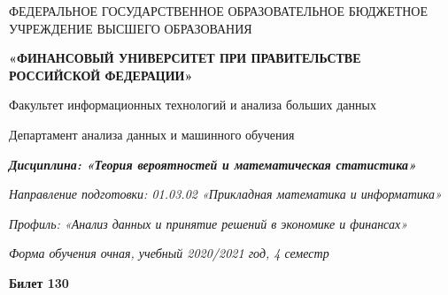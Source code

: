 \documentclass[a4paper,14pt]{article}
\begin{document}
\begin{center}
ФЕДЕРАЛЬНОЕ ГОСУДАРСТВЕННОЕ ОБРАЗОВАТЕЛЬНОЕ БЮДЖЕТНОЕ УЧРЕЖДЕНИЕ ВЫСШЕГО ОБРАЗОВАНИЯ

    \textbf{«ФИНАНСОВЫЙ УНИВЕРСИТЕТ ПРИ ПРАВИТЕЛЬСТВЕ РОССИЙСКОЙ ФЕДЕРАЦИИ»}

Факультет информационных технологий и анализа больших данных

Департамент анализа данных и машинного обучения

\textit{
	\textbf{Дисциплина: «Теория вероятностей и математическая статистика»}}

\textit{Направление подготовки: 01.03.02 «Прикладная математика и информатика»}

\textit{Профиль: «Анализ данных и принятие решений в экономике и финансах»}

\textit{Форма обучения очная, учебный 2020/2021 год, 4 семестр}

\textbf{Билет 130}

\end{center}
\end{document}
